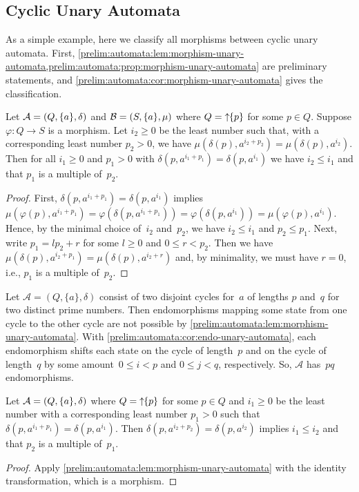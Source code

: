 \subsection{Cyclic Unary Automata}

As a simple example, here we classify all morphisms
between cyclic unary automata. First, \cref{prelim:automata:lem:morphism-unary-automata,prelim:automata:prop:morphism-unary-automata}
are preliminary statements, and \cref{prelim:automata:cor:morphism-unary-automata} 
gives the classification.

\begin{lemma} \label{prelim:automata:lem:morphism-unary-automata}
	Let $\mathcal A = (Q, \{a\}, \delta)$
	and $\mathcal B = (S, \{a\}, \mu)$
	where $Q = \mbox{\ensuremath{\displaystyle \uparrow \!\!\{p\}}}$ for some $p \in Q$.
	Suppose $\varphi \colon Q \to S$ is a morphism.
	Let $i_2 \ge 0$ be the least number such that,
	with a corresponding least number $p_2 > 0$,
	we have $\mu(\delta(p), a^{i_2 + p_2}) = \mu(\delta(p), a^{i_2})$.
	Then for all  $i_1 \ge 0$ and $p_1 > 0$
	with $\delta(p, a^{i_1 + p_1}) = \delta(p, a^{i_1})$ 
	we have  $i_2 \le i_1$ and that $p_1$ is a multiple of~$p_2$. 
\end{lemma}
\begin{proof}
	First, $\delta(p, a^{i_1 + p_1}) = \delta(p, a^{i_1})$
	implies $\mu(\varphi(p), a^{i_1 + p_1}) = 
	\varphi(\delta(p, a^{i_1 + p_1})) = \varphi(\delta(p, a^{i_1})) = \mu(\varphi(p), a^{i_1})$.
	Hence, by the minimal choice of~$i_2$ and~$p_2$,
	we have $i_2 \le i_1$ and $p_2 \le p_1$.
	Next, write $p_1 = l p_2 + r$
	for some $l \ge 0$ and $0 \le r < p_2$.
	Then 
	we have $\mu(\delta(p), a^{i_2 + p_1}) = \mu(\delta(p), a^{i_2 + r})$
	and, by minimality, we must have $r = 0$, i.e., $p_1$
	is a multiple of~$p_2$.	
\end{proof}

\begin{example}
	Let $\mathcal A = (Q, \{a\}, \delta)$ consist of two disjoint
	cycles for~$a$ of lengths $p$ and~$q$
	for two distinct prime numbers.
	Then endomorphisms mapping some state from one cycle
	to the other cycle are not possible by \cref{prelim:automata:lem:morphism-unary-automata}.
	With \cref{prelim:automata:cor:endo-unary-automata}, each endomorphism
	shifts each state on the cycle of length~$p$
	and on the cycle of length~$q$ by some
	amount~$0 \le i < p$ and $0 \le j < q$, respectively.
	So, $\mathcal A$
	has~$pq$ endomorphisms.
\end{example}

\begin{corollary} \label{prelim:automata:cor:morphism-unary-automata}
	Let $\mathcal A = (Q, \{a\}, \delta)$ 
	where $Q = \mbox{\ensuremath{\displaystyle \uparrow \!\!\{p\}}}$ for some $p \in Q$
	and $i_1 \ge 0$ be the least number
	with a corresponding least number $p_1 > 0$
	such that $\delta(p, a^{i_1+p_1}) = \delta(p, a^{i_1})$.
	Then $\delta(p, a^{i_2 + p_2}) = \delta(p, a^{i_2})$
	implies $i_1 \le i_2$ and that $p_2$ is a multiple of~$p_1$.
\end{corollary}
\begin{proof}
	Apply \cref{prelim:automata:lem:morphism-unary-automata} with the identity transformation, which is a morphism.
\end{proof}

